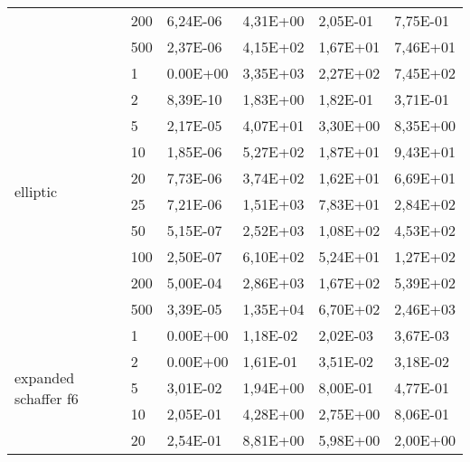 \begin{longtable}[c]{|p{3.5cm}|l|l|l|l|l|}
                                        & 200       & 6,24E-06   & 4,31E+00   & 2,05E-01   & 7,75E-01  \\ \cline{2-6} 
                                        & 500       & 2,37E-06   & 4,15E+02   & 1,67E+01   & 7,46E+01  \\ \hline
\multirow[t]{10}{*}{elliptic}              & 1         & 0.00E+00   & 3,35E+03   & 2,27E+02   & 7,45E+02  \\ \cline{2-6} 
                                        & 2         & 8,39E-10   & 1,83E+00   & 1,82E-01   & 3,71E-01  \\ \cline{2-6} 
                                        & 5         & 2,17E-05   & 4,07E+01   & 3,30E+00   & 8,35E+00  \\ \cline{2-6} 
                                        & 10        & 1,85E-06   & 5,27E+02   & 1,87E+01   & 9,43E+01  \\ \cline{2-6} 
                                        & 20        & 7,73E-06   & 3,74E+02   & 1,62E+01   & 6,69E+01  \\ \cline{2-6} 
                                        & 25        & 7,21E-06   & 1,51E+03   & 7,83E+01   & 2,84E+02  \\ \cline{2-6} 
                                        & 50        & 5,15E-07   & 2,52E+03   & 1,08E+02   & 4,53E+02  \\ \cline{2-6} 
                                        & 100       & 2,50E-07   & 6,10E+02   & 5,24E+01   & 1,27E+02  \\ \cline{2-6} 
                                        & 200       & 5,00E-04   & 2,86E+03   & 1,67E+02   & 5,39E+02  \\ \cline{2-6} 
                                        & 500       & 3,39E-05   & 1,35E+04   & 6,70E+02   & 2,46E+03  \\ \hline
\multirow[t]{10}{*}{expanded schaffer f6}  & 1         & 0.00E+00   & 1,18E-02   & 2,02E-03   & 3,67E-03  \\ \cline{2-6} 
                                        & 2         & 0.00E+00   & 1,61E-01   & 3,51E-02   & 3,18E-02  \\ \cline{2-6} 
                                        & 5         & 3,01E-02   & 1,94E+00   & 8,00E-01   & 4,77E-01  \\ \cline{2-6} 
                                        & 10        & 2,05E-01   & 4,28E+00   & 2,75E+00   & 8,06E-01  \\ \cline{2-6} 
                                        & 20        & 2,54E-01   & 8,81E+00   & 5,98E+00   & 2,00E+00  \\ \cline{2-6} 

\end{longtable}

